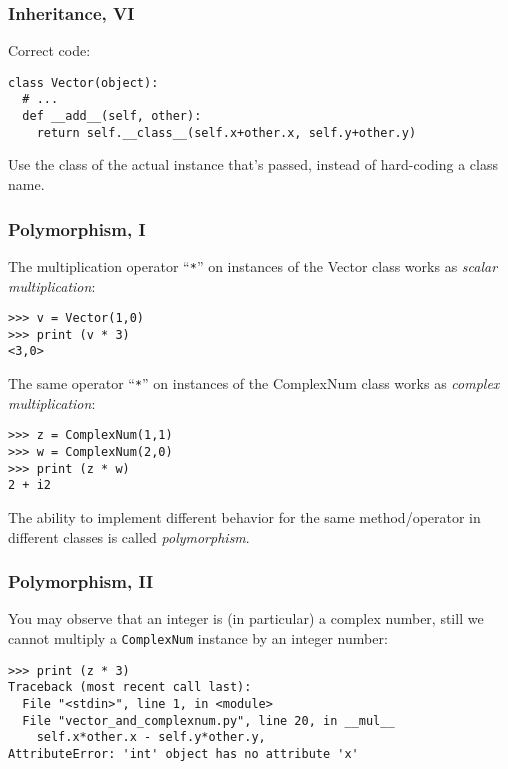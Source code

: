 \begin{frame}[fragile]\frametitle{Inheritance, VI}
  Correct code:
    \begin{lstlisting}
class Vector(object):
  # ...
  def __add__(self, other):
    return self.__class__(self.x+other.x, self.y+other.y)
    \end{lstlisting}
    Use the class of the actual instance that's passed,
    instead of hard-coding a class name.
\end{frame}

\begin{frame}[fragile]\frametitle{Polymorphism, I}

  The multiplication operator ``\texttt{*}'' on instances of the
  Vector class works as \emph{scalar multiplication}:
\begin{lstlisting}
>>> v = Vector(1,0)
>>> print (v * 3)
<3,0>
\end{lstlisting}

  The same operator ``\texttt{*}'' on instances of the
  ComplexNum class works as \emph{complex multiplication}:
\begin{lstlisting}
>>> z = ComplexNum(1,1)
>>> w = ComplexNum(2,0)
>>> print (z * w)
2 + i2
\end{lstlisting}

  \small
  The ability to implement different behavior for the same
  method/operator in different classes is called \emph{polymorphism}.

\end{frame}

\begin{frame}[fragile]\frametitle{Polymorphism, II}

  You may observe that an integer is (in particular) a complex number,
  still we cannot multiply a \texttt{ComplexNum} instance by an
  integer number:
\begin{lstlisting}
>>> print (z * 3)
Traceback (most recent call last):
  File "<stdin>", line 1, in <module>
  File "vector_and_complexnum.py", line 20, in __mul__
    self.x*other.x - self.y*other.y,
AttributeError: 'int' object has no attribute 'x'
\end{lstlisting}

\end{frame}

